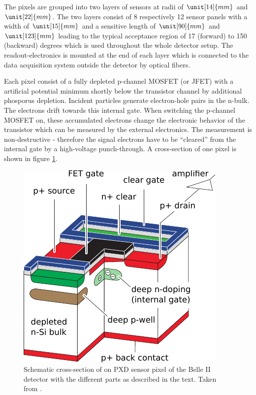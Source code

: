 The pixels are grouped into two layers of sensors at radii of $\unit[14]{mm}$ and $\unit[22]{mm}$. The two layers consist of 8 respectively 12 sensor panels with a width of $\unit[15]{mm}$ and a sensitive length of $\unit[90]{mm}$ and $\unit[123]{mm}$ leading to the typical acceptance region of 17 (forward) to 150 (backward) degrees which is used throughout the whole detector setup. The readout-electronics is mounted at the end of each layer which is connected to the data acquisition system outside the detector by optical fibers.

Each pixel consist of a fully depleted p-channel MOSFET (or JFET) with a artificial potential minimum shortly below the transistor channel by additional phosporus depletion. Incident particles generate electron-hole pairs in the n-bulk. The electrons drift towards this internal gate. When switching the p-channel MOSFET on, these accumulated electrons change the electronic behavior of the transistor which can be measured by the external electronics. The measurement is non-destructive - therefore the signal electrons have to be ``cleared'' from the internal gate by a high-voltage punch-through. A cross-section of one pixel is shown in figure \ref{fig-pxd-schema}.

\begin{figure}
  \centering
  \includegraphics[width=0.6\linewidth]{figures/experimental_setup/pxd.pdf}
  \caption[Cross-section of a PXD sensor]{Schematic cross-section of on PXD sensor pixel of the Belle II detector with the different parts as described in the text. Taken from \cite{tdr}.}
  \label{fig-pxd-schema}
\end{figure}



